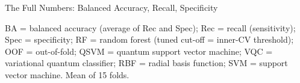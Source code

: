 \documentclass[aspectratio=169,10pt,t,xcolor={table,dvipsnames}]{beamer}
\newcommand{\pfoot}[1]{\vfill{\raggedright\tiny\color{qslate}#1\par}}
\begin{document}
\begin{frame}{The Full Numbers: Balanced Accuracy, Recall, Specificity}
  \pfoot{BA = balanced accuracy (average of Rec and Spec); Rec = recall (sensitivity); Spec = specificity; RF = random forest (tuned cut-off = inner-CV threshold); OOF = out-of-fold; QSVM = quantum support vector machine; VQC = variational quantum classifier; RBF = radial basis function; SVM = support vector machine. Mean of 15 folds.}
\end{frame}
\end{document}
